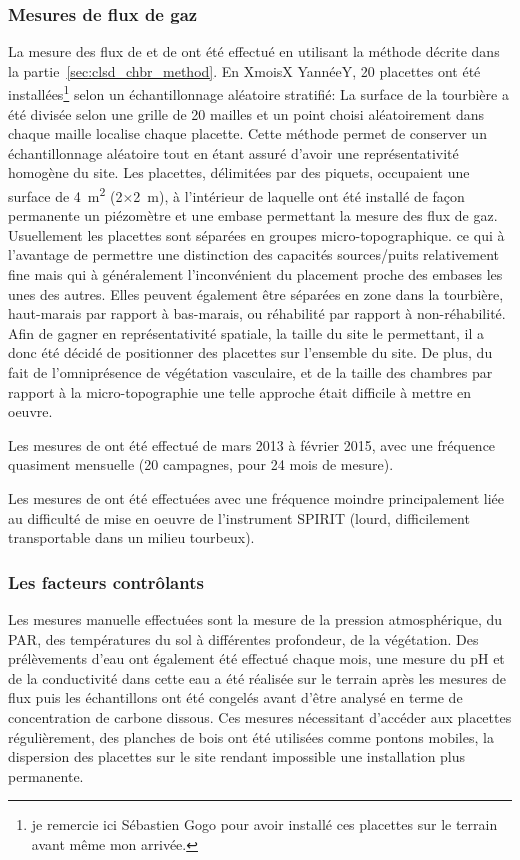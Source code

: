 \subsubsection{Mesures de flux de gaz}
La mesure des flux de \coo et de \chh ont été effectué en utilisant la méthode décrite dans la partie~\ref{sec:clsd_chbr_method}.
En XmoisX YannéeY, 20 placettes ont été installées\footnote{je remercie ici Sébastien Gogo pour avoir installé ces placettes sur le terrain avant même mon arrivée.} selon un échantillonnage aléatoire stratifié:
La surface de la tourbière a été divisée selon une grille de 20 mailles et un point choisi aléatoirement dans chaque maille localise chaque placette.
Cette méthode permet de conserver un échantillonnage aléatoire tout en étant assuré d'avoir une représentativité homogène du site. 
Les placettes, délimitées par des piquets, occupaient une surface de \SI{4}{\square\metre} (2$\times$\SI{2}{\metre}), à l'intérieur de laquelle ont été installé de façon permanente un piézomètre et une embase permettant la mesure des flux de gaz.
Usuellement les placettes sont séparées en groupes micro-topographique. ce qui à l'avantage de permettre une distinction des capacités sources/puits relativement fine mais qui à généralement l'inconvénient du placement proche des embases les unes des autres.
Elles peuvent également être séparées en zone dans la tourbière, haut-marais par rapport à bas-marais, ou réhabilité par rapport à non-réhabilité.
Afin de gagner en représentativité spatiale, la taille du site le permettant, il a donc été décidé de positionner des placettes sur l'ensemble du site.
De plus, du fait de l'omniprésence de végétation vasculaire, et de la taille des chambres par rapport à la micro-topographie une telle approche était difficile à mettre en oeuvre.

Les mesures de \coo ont été effectué de mars 2013 à février 2015, avec une fréquence quasiment mensuelle (20 campagnes, pour 24 mois de mesure).

Les mesures de \chh ont été effectuées avec une fréquence moindre principalement liée au difficulté de mise en oeuvre de l'instrument SPIRIT (lourd, difficilement transportable dans un milieu tourbeux).

\subsubsection{Les facteurs contrôlants}

Les mesures manuelle effectuées sont la mesure de la pression atmosphérique, du PAR, des températures du sol à différentes profondeur, de la végétation.
Des prélèvements d'eau ont également été effectué chaque mois, une mesure du pH et de la conductivité dans cette eau a été réalisée sur le terrain après les mesures de flux puis les échantillons ont été congelés avant d'être analysé en terme de concentration de carbone dissous.
Ces mesures nécessitant d'accéder aux placettes régulièrement, des planches de bois ont été utilisées comme pontons mobiles, la dispersion des placettes sur le site rendant impossible une installation plus permanente.

